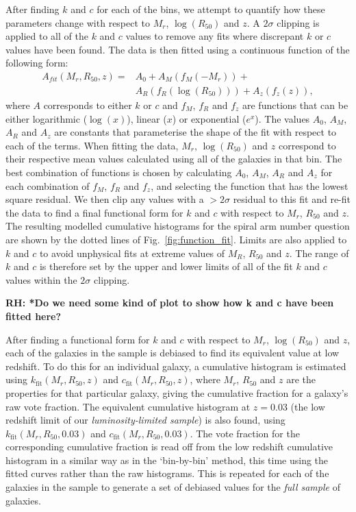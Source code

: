 \documentclass[useAMS,usenatbib]{mn2e}
\newcommand{\rh}[1]{{\bf \textcolor{RoyalPurple}{RH: #1}}}
\begin{document}
After finding $k$ and $c$ for each of the bins, we attempt to quantify how these parameters change with respect to $M_r$, $\log(R_{50})$ and $z$. A $2\sigma$ clipping is applied to all of the $k$ and $c$ values to remove any fits where discrepant $k$ or $c$ values have been found. The data is then fitted using a continuous function of the following form:
\begin{equation}
\begin{split}
A_{fit}(M_r,R_{50},z) = & A_0 + A_M(f_M(-M_r)) +\\
						& A_R(f_R(\log({R_{50}}))) + A_z(f_z(z)) \mathrm{,}
\end{split}
\end{equation}
where $A$ corresponds to either $k$ or $c$ and $f_M$, $f_R$ and $f_z$ are functions that can be either logarithmic ($\log(x)$), linear ($x$) or exponential ($e^x$). The values $A_0$, $A_M$, $A_R$ and $A_z$ are constants that parameterise the shape of the fit with respect to each of the terms. When fitting the data, $M_r$, $\log(R_{50})$ and $z$ correspond to their respective mean values calculated using all of the galaxies in that bin. The best combination of functions is chosen by calculating $A_0$, $A_M$, $A_R$ and $A_z$ for each combination of $f_M$, $f_R$ and $f_z$, and selecting the function that has the lowest square residual. We then clip any values with a $>2\sigma$ residual to this fit and re-fit the data to find a final functional form for $k$ and $c$ with respect to $M_r$, $R_{50}$ and $z$. The resulting modelled cumulative histograms for the spiral arm number question are shown by the dotted lines of Fig.~\ref{fig:function_fit}. Limits are also applied to $k$ and $c$ to avoid unphysical fits at extreme values of $M_R$, $R_{50}$ and $z$. The range of $k$ and $c$ is therefore set by the upper and lower limits of all of the fit $k$ and $c$ values within the $2\sigma$ clipping.

\rh{*Do we need some kind of plot to show how k and c have been fitted here?}

After finding a functional form for $k$ and $c$ with respect to $M_r$, $\log(R_{50})$ and $z$, each of the galaxies in the sample is debiased to find its equivalent value at low redshift. To do this for an individual galaxy, a cumulative histogram is estimated using $k_{\mathrm{fit}}(M_r,R_{50},z)$ and $c_{\mathrm{fit}}(M_r,R_{50},z)$, where $M_r$, $R_{50}$ and $z$ are the properties for that particular galaxy, giving the cumulative fraction for a galaxy's raw vote fraction. The equivalent cumulative histogram at $z=0.03$ (the low redshift limit of our \textit{luminosity-limited sample}) is also found, using $k_{\mathrm{fit}}(M_r,R_{50},0.03)$ and $c_{\mathrm{fit}}(M_r,R_{50},0.03)$. The vote fraction for the corresponding cumulative fraction is read off from the low redshift cumulative histogram in a similar way as in the `bin-by-bin' method, this time using the fitted curves rather than the raw histograms. This is repeated for each of the galaxies in the sample to generate a set of debiased values for the \textit{full sample} of galaxies.
\end{document}
